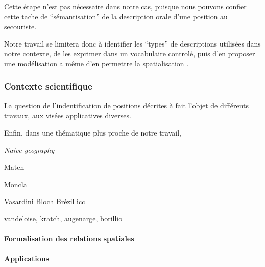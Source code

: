 Cette étape n'est pas nécessaire dans notre cas, puisque nous pouvons
confier cette tache de \enquote{sémantisation} de la description orale
d'une position au secouriste. 

Notre travail se limitera donc à identifier les \enquote{types} de
descriptions utilisées dans notre contexte, de les exprimer dans un
vocabulaire controlé, puis d'en proposer une modélisation a même d'en
permettre la spatialisation .

\subsubsection{Contexte scientifique}

La question de l'indentification de positions décrites à fait l'objet
de différents travaux, aux visées applicatives diverses.



Enfin, dans une thématique plus proche de notre travail,  

\emph{Naive geography} \autocite{Egenhofer1995}

Mateh

Moncla



Vasardini
Bloch
Brézil icc

vandeloise, kratch, augenarge, borillio 

\paragraph{Formalisation des relations spatiales}
\autocite{Vandeloise1986}
\autocite{Borillo1998}
\autocite{Bateman2010}
\autocite{Kracht2002}
\autocite{Aurnague1993}
\autocite{Mark1999}
\autocite{Freksa2018}
\autocite{Carlson2005}
\autocite{Lang1991}

\autocite{Hois2008}
\autocite{Frank1992}
\autocite{Moratz2008}
\autocite{Cohn2001}
\autocite{Kordjamshidi2012}
\autocite{Matsakis2010}
\autocite{Frank1997}
\autocite{Talmy2005}
\autocite{Freeman1975}
\autocite{Zelinsky-Wibbelt1993}
\autocite{Carlson2004}
\autocite{Gui-Wu2009}

\paragraph{Applications}
\autocite{Xu2007a}
\autocite{Xu2007}
\autocite{Xu2006}
\autocite{Wolter2018}
\autocite{Dittrich2015}
\autocite{Vanegas2011}
\autocite{Du2016}
\autocite{Hornsby2009}
\autocite{Mathet2000}
\autocite{Hudelot2008a}
\autocite{Bloch1996}
\autocite{Hudelot2008}
\autocite{Levit2007}
\autocite{Evans2008}
\autocite{Takemura2012}
\autocite{Shariff1998}
\autocite{Skubic2004}
\autocite{Hall2015}
\autocite{Leopold2015}
\autocite{Denis1997}

